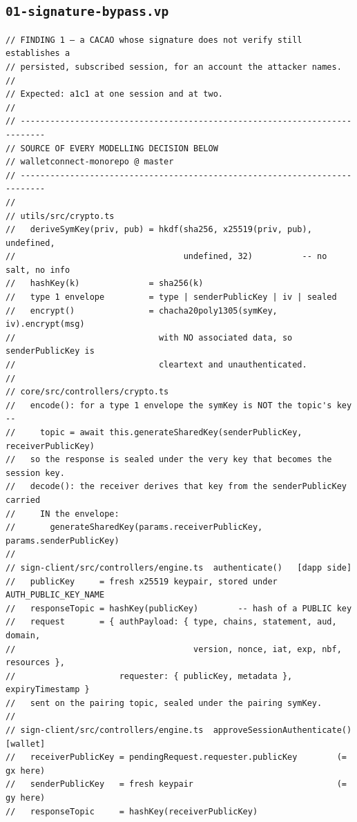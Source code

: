 \documentclass[11pt]{article}
\begin{document}
\subsection{\texorpdfstring{\texttt{01-signature-bypass.vp}}{01-signature-bypass.vp}}
\label{lst:01-signature-bypass-vp-0}
\begin{lstlisting}
// FINDING 1 — a CACAO whose signature does not verify still establishes a
// persisted, subscribed session, for an account the attacker names.
//
// Expected: a1c1 at one session and at two.
//
// ---------------------------------------------------------------------------
// SOURCE OF EVERY MODELLING DECISION BELOW
// walletconnect-monorepo @ master
// ---------------------------------------------------------------------------
//
// utils/src/crypto.ts
//   deriveSymKey(priv, pub) = hkdf(sha256, x25519(priv, pub), undefined,
//                                  undefined, 32)          -- no salt, no info
//   hashKey(k)              = sha256(k)
//   type 1 envelope         = type | senderPublicKey | iv | sealed
//   encrypt()               = chacha20poly1305(symKey, iv).encrypt(msg)
//                             with NO associated data, so senderPublicKey is
//                             cleartext and unauthenticated.
//
// core/src/controllers/crypto.ts
//   encode(): for a type 1 envelope the symKey is NOT the topic's key --
//     topic = await this.generateSharedKey(senderPublicKey, receiverPublicKey)
//   so the response is sealed under the very key that becomes the session key.
//   decode(): the receiver derives that key from the senderPublicKey carried
//     IN the envelope:
//       generateSharedKey(params.receiverPublicKey, params.senderPublicKey)
//
// sign-client/src/controllers/engine.ts  authenticate()   [dapp side]
//   publicKey     = fresh x25519 keypair, stored under AUTH_PUBLIC_KEY_NAME
//   responseTopic = hashKey(publicKey)        -- hash of a PUBLIC key
//   request       = { authPayload: { type, chains, statement, aud, domain,
//                                    version, nonce, iat, exp, nbf, resources },
//                     requester: { publicKey, metadata }, expiryTimestamp }
//   sent on the pairing topic, sealed under the pairing symKey.
//
// sign-client/src/controllers/engine.ts  approveSessionAuthenticate()  [wallet]
//   receiverPublicKey = pendingRequest.requester.publicKey        (= gx here)
//   senderPublicKey   = fresh keypair                             (= gy here)
//   responseTopic     = hashKey(receiverPublicKey)

\end{lstlisting}
\end{document}
